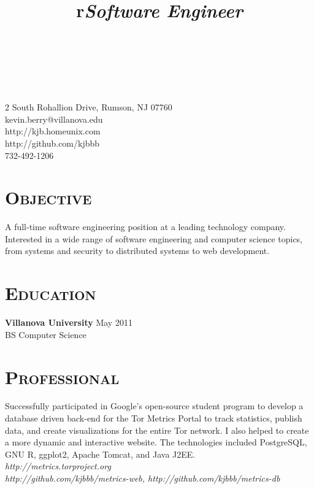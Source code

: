 \documentclass[line,margin]{resume}
\begin{document}
\begin{format}
  \title{r}\\
  \\
  \body\\
\end{format}


\begin{resume}
\begin{flushright}
2 South Rohallion Drive, Rumson, NJ 07760 \\
kevin.berry@villanova.edu \\
http://kjb.homeunix.com \\
http://github.com/kjbbb\\
732-492-1206 \\
\end{flushright}

\section{\textsc{Objective}}
A full-time software engineering position at a leading technology company.
Interested in a wide range of software engineering and computer science topics,
from systems and security to distributed systems to web development.
\section{\textsc{Education}}

\textbf{Villanova University} \hfill May 2011 \\
BS Computer Science


\section{\textsc{Professional}}

\title{\emph{Software Engineer}}
\begin{position}
Successfully participated in Google's open-source student program to develop a
database driven back-end for the Tor Metrics Portal to track statistics, publish
data, and create visualizations for the entire Tor network. I also helped to
create a more dynamic and interactive website. The technologies included
PostgreSQL, GNU R, ggplot2, Apache Tomcat, and Java J2EE.\\
\emph{http://metrics.torproject.org} \\
\emph{http://github.com/kjbbb/metrics-web, http://github.com/kjbbb/metrics-db}
\end{position}


\end{resume}
\end{document}
